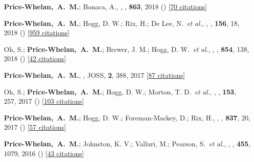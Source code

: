 \item[{\color{deemph}\scriptsize9}]\textbf{Price-Whelan,~A.~M.}; Bonaca, A., , \apj, \textbf{863}, 2018 () [\href{http://adsabs.harvard.edu/abs/2018ApJ...863L..20P}{70 citations}]

\item[{\color{deemph}\scriptsize8}]\textbf{Price-Whelan,~A.~M.}; Hogg, D. W.; Rix, H.; De Lee, N.~\textit{et al.}, , \aj, \textbf{156}, 18, 2018 () [\href{http://adsabs.harvard.edu/abs/2018AJ....156...18P}{959 citations}]

\item[{\color{deemph}\scriptsize7}]Oh, S.; \textbf{Price-Whelan,~A.~M.}; Brewer, J. M.; Hogg, D. W.~\textit{et al.}, , \apj, \textbf{854}, 138, 2018 () [\href{http://adsabs.harvard.edu/abs/2018ApJ...854..138O}{42 citations}]

\item[{\color{deemph}\scriptsize6}]\textbf{Price-Whelan,~A.~M.}, , JOSS, \textbf{2}, 388, 2017 [\href{http://adsabs.harvard.edu/abs/2017JOSS....2..388P}{87 citations}]

\item[{\color{deemph}\scriptsize5}]Oh, S.; \textbf{Price-Whelan,~A.~M.}; Hogg, D. W.; Morton, T. D.~\textit{et al.}, , \aj, \textbf{153}, 257, 2017 () [\href{http://adsabs.harvard.edu/abs/2017AJ....153..257O}{103 citations}]

\item[{\color{deemph}\scriptsize4}]\textbf{Price-Whelan,~A.~M.}; Hogg, D. W.; Foreman-Mackey, D.; Rix, H., , \apj, \textbf{837}, 20, 2017 () [\href{http://adsabs.harvard.edu/abs/2017ApJ...837...20P}{57 citations}]

\item[{\color{deemph}\scriptsize3}]\textbf{Price-Whelan,~A.~M.}; Johnston, K. V.; Valluri, M.; Pearson, S.~\textit{et al.}, , \mnras, \textbf{455}, 1079, 2016 () [\href{http://adsabs.harvard.edu/abs/2016MNRAS.455.1079P}{43 citations}]

